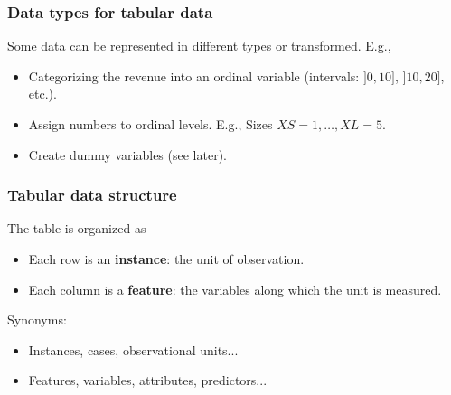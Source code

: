 \begin{frame}
\frametitle{Data types for tabular data}
Some data can be represented in different types or transformed. E.g., 
\begin{itemize}
\item Categorizing the revenue into an ordinal variable (intervals: $]0,10]$, $]10,20]$, etc.).
\item Assign numbers to ordinal levels. E.g., Sizes $XS=1, \ldots, XL=5$.
\item Create dummy variables (see later).
\end{itemize}
\end{frame}
\begin{frame}
\frametitle{Tabular data structure}
The table is organized as 
\begin{itemize}
\item Each row is an {\bf instance}: the unit of observation. 
\item Each column is a {\bf feature}: the variables along which the unit is measured.
\end{itemize}
Synonyms:
\begin{itemize}
\item Instances, cases, observational units... 
\item Features, variables, attributes, predictors...
\end{itemize}
\end{frame}
